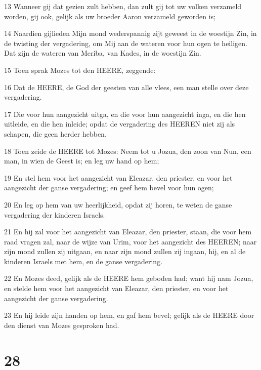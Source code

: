 \par 13 Wanneer gij dat gezien zult hebben, dan zult gij tot uw volken verzameld worden, gij ook, gelijk als uw broeder Aaron verzameld geworden is;
\par 14 Naardien gijlieden Mijn mond wederspannig zijt geweest in de woestijn Zin, in de twisting der vergadering, om Mij aan de wateren voor hun ogen te heiligen. Dat zijn de wateren van Meriba, van Kades, in de woestijn Zin.
\par 15 Toen sprak Mozes tot den HEERE, zeggende:
\par 16 Dat de HEERE, de God der geesten van alle vlees, een man stelle over deze vergadering.
\par 17 Die voor hun aangezicht uitga, en die voor hun aangezicht inga, en die hen uitleide, en die hen inleide; opdat de vergadering des HEEREN niet zij als schapen, die geen herder hebben.
\par 18 Toen zeide de HEERE tot Mozes: Neem tot u Jozua, den zoon van Nun, een man, in wien de Geest is; en leg uw hand op hem;
\par 19 En stel hem voor het aangezicht van Eleazar, den priester, en voor het aangezicht der ganse vergadering; en geef hem bevel voor hun ogen;
\par 20 En leg op hem van uw heerlijkheid, opdat zij horen, te weten de ganse vergadering der kinderen Israels.
\par 21 En hij zal voor het aangezicht van Eleazar, den priester, staan, die voor hem raad vragen zal, naar de wijze van Urim, voor het aangezicht des HEEREN; naar zijn mond zullen zij uitgaan, en naar zijn mond zullen zij ingaan, hij, en al de kinderen Israels met hem, en de ganse vergadering.
\par 22 En Mozes deed, gelijk als de HEERE hem geboden had; want hij nam Jozua, en stelde hem voor het aangezicht van Eleazar, den priester, en voor het aangezicht der ganse vergadering.
\par 23 En hij leide zijn handen op hem, en gaf hem bevel; gelijk als de HEERE door den dienst van Mozes gesproken had.

\chapter{28}

